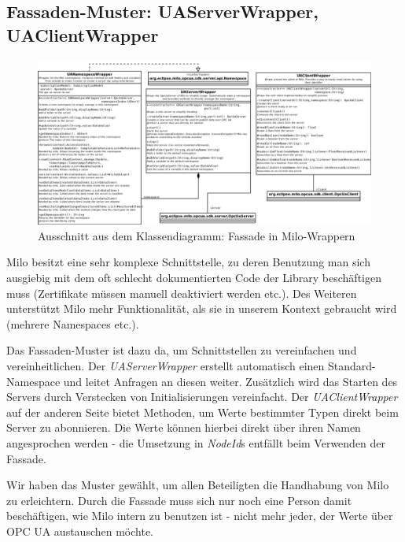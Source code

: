\documentclass[parskip=full]{scrartcl}
\begin{document}
\subsection{Fassaden-Muster: UAServerWrapper, UAClientWrapper}
\begin{figure}[H]
  \centering
  \includegraphics[scale=0.3]{design/pattern-screenshots/facade-UAWrapper.png}
  \caption{Ausschnitt aus dem Klassendiagramm: Fassade in Milo-Wrappern}
\end{figure}
Milo besitzt eine sehr komplexe Schnittstelle, zu deren Benutzung man sich ausgiebig mit dem oft schlecht dokumentierten Code
der Library beschäftigen muss (Zertifikate müssen manuell deaktiviert werden etc.). Des Weiteren unterstützt Milo mehr Funktionalität,
als sie in unserem Kontext gebraucht wird (mehrere Namespaces etc.).

Das Fassaden-Muster ist dazu da, um Schnittstellen zu vereinfachen und vereinheitlichen.
Der \emph{UAServerWrapper} erstellt automatisch einen Standard-Namespace und leitet Anfragen an
diesen weiter. Zusätzlich wird das Starten des Servers durch Verstecken von Initialisierungen vereinfacht. Der \emph{UAClientWrapper}
auf der anderen Seite bietet Methoden, um Werte bestimmter Typen direkt beim Server zu abonnieren. Die Werte können hierbei direkt über ihren
Namen angesprochen werden - die Umsetzung in \emph{NodeId}s entfällt beim Verwenden der Fassade.

Wir haben das Muster gewählt, um allen
Beteiligten die Handhabung von Milo zu erleichtern. Durch die Fassade muss sich nur noch eine Person damit beschäftigen, wie
Milo intern zu benutzen ist - nicht mehr jeder, der Werte über OPC UA austauschen möchte.

\pagebreak
\end{document}
